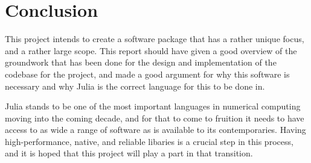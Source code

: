 \section{Conclusion}
This project intends to create a software package that has a rather unique focus, and a rather large scope. This report should have given a good overview of the groundwork that has been done for the design and implementation of the codebase for the project, and made a good argument for why this software is necessary and why Julia is the correct language for this to be done in. 

Julia stands to be one of the most important languages in numerical computing moving into the coming decade, and for that to come to fruition it needs to have access to as wide a range of software as is available to its contemporaries. Having high-performance, native, and reliable libaries is a crucial step in this process, and it is hoped that this project will play a part in that transition.